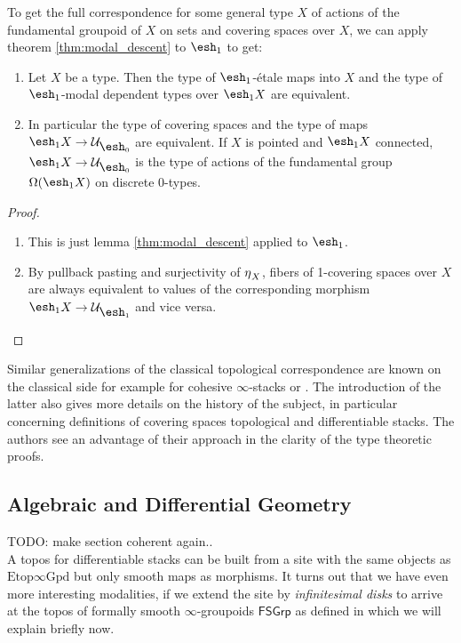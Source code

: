 \documentclass[9pt,twosided]{amsart}
\newcommand{\shape}{\ensuremath{\mathord{\raisebox{0.5pt}{\text{\rm\esh}}}}}
\newcommand{\FSGrp}{\ensuremath{\mathsf{FSGrp}}}
\newcommand{\Spaces}{\ensuremath{\mathrm{Etop}\infty\mathrm{Gpd}}}
\newcommand{\todo}[1]{{\color{red}TODO: #1 \\}}
\begin{document}
To get the full correspondence for some general type $X$ of actions of the fundamental groupoid of $X$ on sets and covering spaces over $X$,
we can apply theorem \ref{thm:modal_descent} to $\shape_1$ to get:

\begin{thm}
  \begin{enumerate}
  \item Let $X$ be a type. Then the type of $\shape_1$-étale maps into $X$ and the type of $\shape_1$-modal dependent types over $\shape_1 X$ are equivalent.
  \item In particular the type of covering spaces and the type of maps $\shape_1X\to \mathcal U_{\shape_0}$ are equivalent.
    If $X$ is pointed and $\shape_1 X$ connected, $\shape_1X\to \mathcal U_{\shape_0}$ is the type of actions of the fundamental group $\Omega(\shape_1 X)$ on discrete 0-types.
  \end{enumerate}
\end{thm}
\begin{proof}
  \begin{enumerate}
  \item This is just lemma \ref{thm:modal_descent} applied to $\shape_1$.
  \item By pullback pasting and surjectivity of ${\eta_{}}_X$, fibers of 1-covering spaces over $X$ are always equivalent to values of the corresponding morphism $\shape_1 X\to \mathcal U_{\shape_1}$ and vice versa.
  \end{enumerate}
\end{proof}

Similar generalizations of the classical topological correspondence are known on the classical side
for example for cohesive $\infty$-stacks \cite[Section 5.2.7]{SchreiberDcct} or \cite{dmr-2covers}.
The introduction of the latter also gives more details on the history of the subject,
in particular concerning definitions of covering spaces topological and differentiable stacks.
The authors see an advantage of their approach in the clarity of the type theoretic proofs.

\subsection{Algebraic and Differential Geometry}
\label{subsection:algebraic and differential geometry}
\todo{make section coherent again..}
A topos for differentiable stacks can be built from a site with the same objects as $\Spaces$ but only smooth maps as morphisms.
It turns out that we have even more interesting modalities, if we extend the site by \emph{infinitesimal disks} to arrive at the topos of
formally smooth $\infty$-groupoids $\FSGrp$ as defined in \cite[Definition 2.11]{SyntheticPDEs} which we will explain briefly now.
\end{document}
